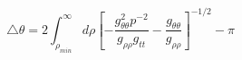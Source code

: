 \begin{equation}
\label{lightray}
\bigtriangleup \theta = 2 \int _{\rho _{min}}^{\infty}
d \rho [ - \frac{g^2_{\theta \theta} p^{-2}}
{g _{\rho \rho} g_{tt}} - \frac{g_{\theta\theta}}{g_{\rho \rho}} ]^{-1/2} -
 \pi
\end{equation}


